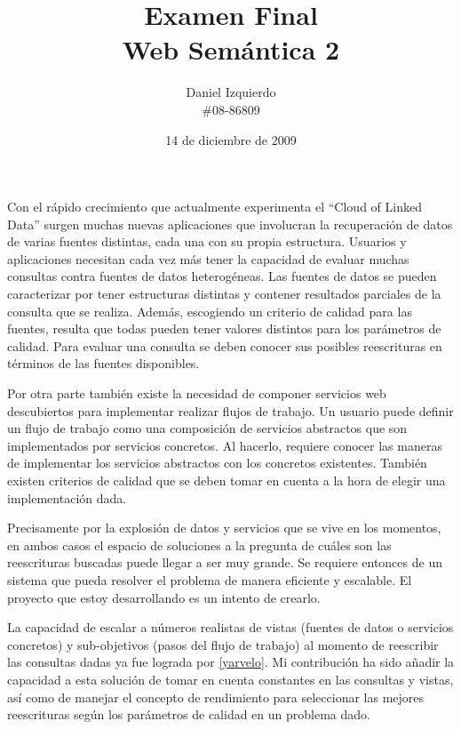 \documentclass{article}
\begin{document}

\author{Daniel Izquierdo \\ \#08-86809}
\title{Examen Final \\ Web Semántica 2}
\date{14 de diciembre de 2009}
\maketitle


Con el rápido crecimiento que actualmente experimenta el ``Cloud of Linked
Data'' surgen muchas nuevas aplicaciones que involucran la recuperación de datos
de varias fuentes distintas, cada una con su propia estructura. Usuarios y
aplicaciones necesitan cada vez más tener la capacidad de evaluar muchas consultas
contra fuentes de datos heterogéneas. Las fuentes de datos se pueden
caracterizar por tener estructuras distintas y contener resultados parciales de
la consulta que se realiza. Además, escogiendo un criterio de calidad para las
fuentes, resulta que todas pueden tener valores distintos para los parámetros de
calidad. Para evaluar una consulta se deben conocer sus posibles reescrituras en
términos de las fuentes disponibles.

Por otra parte también existe la necesidad de componer servicios web
descubiertos para implementar realizar flujos de trabajo. Un usuario puede
definir un flujo de trabajo como una composición de servicios abstractos que son
implementados por servicios concretos. Al hacerlo, requiere conocer las maneras
de implementar los servicios abstractos con los concretos existentes. También
existen criterios de calidad que se deben tomar en cuenta a la hora de elegir
una implementación dada.

Precisamente por la explosión de datos y servicios que se vive en los momentos,
en ambos casos el espacio de soluciones a la pregunta de cuáles son las
reescrituras buscadas puede llegar a ser muy grande. Se requiere entonces de un
sistema que pueda resolver el problema de manera eficiente y escalable. El
proyecto que estoy desarrollando es un intento de crearlo.

La capacidad de escalar a números realistas de vistas (fuentes de datos o
servicios concretos) y sub-objetivos (pasos del flujo de trabajo) al momento de
reescribir las consultas dadas ya fue lograda por \ref{yarvelo}. Mi contribución
ha sido añadir la capacidad a esta solución de tomar en cuenta constantes en las
consultas y vistas, así como de manejar el concepto de rendimiento para
seleccionar las mejores reescrituras según los parámetros de calidad en un
problema dado.
\end{document}
